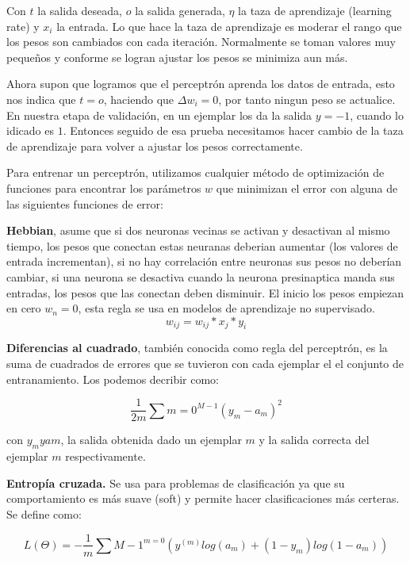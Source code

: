  
Con $t$ la salida deseada, $o$ la salida generada, $\eta$ la taza de aprendizaje (learning rate) y $x_{i}$ la entrada. Lo que hace la taza de aprendizaje es moderar el rango que los pesos son cambiados con cada iteración. Normalmente se toman valores muy pequeños y conforme se logran ajustar los pesos se minimiza aun más.

Ahora supon que logramos que el perceptrón aprenda los datos de entrada, esto nos indica que $t = o$, haciendo que \(\Delta w_{i} = 0\), por tanto ningun peso se actualice. En nuestra etapa de validación, en un ejemplar los da la salida $y = -1$, cuando lo idicado es $1$. Entonces seguido de esa prueba necesitamos hacer cambio de la taza de aprendizaje para volver a ajustar los pesos correctamente.

Para entrenar un perceptrón, utilizamos cualquier método de optimización de funciones para encontrar los parámetros $w$ que minimizan el error con alguna de las siguientes funciones de error:

\begin{description}
 \item \textbf{Hebbian}, asume que si dos neuronas vecinas se activan y desactivan al mismo tiempo, los pesos que conectan estas neuranas deberian aumentar (los valores de entrada incrementan), si no hay correlación entre neuronas sus pesos no deberían cambiar, si una neurona se desactiva cuando la neurona presinaptica manda sus entradas, los pesos que las conectan deben disminuir. El inicio los pesos empiezan en cero $w_{n} = 0$, esta regla se usa en modelos de aprendizaje no supervisado. \[w_{ij} = w_{ij} * x_{j} * y_{i}\]   
 \item \textbf{Diferencias al cuadrado}, también conocida como regla del perceptrón, es la suma de cuadrados de errores que se tuvieron con cada ejemplar el el conjunto de entranamiento. Los podemos decribir como: 
 
 \begin{equation}
   \dfrac{1}{2m}\sum{m=0}^{M-1} (y_{m} - a_{m})^2
 \end{equation}
 
 con $y_{m} y a{m}$, la salida obtenida dado un ejemplar $m$ y la salida correcta del ejemplar $m$ respectivamente.
 \item \textbf{Entropía cruzada.} Se usa para problemas de clasificación ya que su comportamiento es más suave (soft) y permite hacer clasificaciones más certeras. Se define como:

 \begin{equation}
  L (\Theta) = -\dfrac{1}{m}\sum{M-1}^{m=0}(y^(m)log(a_{m}) + (1-y_{m}) log(1-a_{m})) 
 \end{equation}

\end{description}
